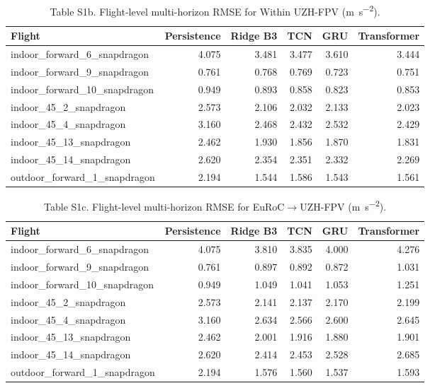\documentclass[11pt]{article}
\begin{document}
\begin{table}[htbp]\centering
\caption*{Table S1b. Flight-level multi-horizon RMSE for Within UZH-FPV (\si{\metre\per\second\squared}).}
\scriptsize
\begin{tabular}{p{}rrrrr}
\toprule
Flight & Persistence & Ridge B3 & TCN & GRU & Transformer\\
\midrule
indoor\_forward\_6\_snapdragon & 4.075 & 3.481 & 3.477 & 3.610 & 3.444 \\
indoor\_forward\_9\_snapdragon & 0.761 & 0.768 & 0.769 & 0.723 & 0.751 \\
indoor\_forward\_10\_snapdragon & 0.949 & 0.893 & 0.858 & 0.823 & 0.853 \\
indoor\_45\_2\_snapdragon & 2.573 & 2.106 & 2.032 & 2.133 & 2.023 \\
indoor\_45\_4\_snapdragon & 3.160 & 2.468 & 2.432 & 2.532 & 2.429 \\
indoor\_45\_13\_snapdragon & 2.462 & 1.930 & 1.856 & 1.870 & 1.831 \\
indoor\_45\_14\_snapdragon & 2.620 & 2.354 & 2.351 & 2.332 & 2.269 \\
outdoor\_forward\_1\_snapdragon & 2.194 & 1.544 & 1.586 & 1.543 & 1.561 \\
\bottomrule
\end{tabular}
\end{table}
\begin{table}[htbp]\centering
\caption*{Table S1c. Flight-level multi-horizon RMSE for EuRoC$\rightarrow$UZH-FPV (\si{\metre\per\second\squared}).}
\scriptsize
\begin{tabular}{p{}rrrrr}
\toprule
Flight & Persistence & Ridge B3 & TCN & GRU & Transformer\\
\midrule
indoor\_forward\_6\_snapdragon & 4.075 & 3.810 & 3.835 & 4.000 & 4.276 \\
indoor\_forward\_9\_snapdragon & 0.761 & 0.897 & 0.892 & 0.872 & 1.031 \\
indoor\_forward\_10\_snapdragon & 0.949 & 1.049 & 1.041 & 1.053 & 1.251 \\
indoor\_45\_2\_snapdragon & 2.573 & 2.141 & 2.137 & 2.170 & 2.199 \\
indoor\_45\_4\_snapdragon & 3.160 & 2.634 & 2.566 & 2.600 & 2.645 \\
indoor\_45\_13\_snapdragon & 2.462 & 2.001 & 1.916 & 1.880 & 1.901 \\
indoor\_45\_14\_snapdragon & 2.620 & 2.414 & 2.453 & 2.528 & 2.685 \\
outdoor\_forward\_1\_snapdragon & 2.194 & 1.576 & 1.560 & 1.537 & 1.593 \\
\bottomrule
\end{tabular}
\end{table}
\end{document}
